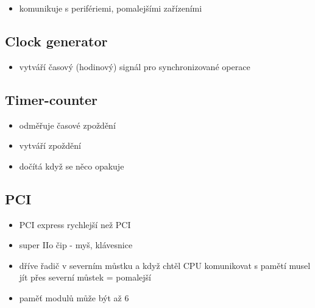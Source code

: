 \documentclass[a4paper,12pt]{article}
\begin{document}
\begin{itemize}
  \item komunikuje s perifériemi, pomalejšími zařízeními
\end{itemize}

\subsection{Clock generator}

\begin{itemize}
  \item vytváří časový (hodinový) signál pro synchronizované operace
\end{itemize}

\subsection{Timer-counter}

\begin{itemize}
  \item odměřuje časové zpoždění
  \item vytváří zpoždění
  \item dočítá když se něco opakuje
\end{itemize}
  
\subsection{PCI}
\begin{itemize}
  \item PCI express rychlejší než PCI
  \item super IIo čip - myš, klávesnice
\end{itemize}


\begin{itemize}
  \item dříve řadič v severním můstku a když chtěl CPU komunikovat s pamětí musel jít přes severní můstek = pomalejší
  \item paměť modulů může být až 6
\end{itemize}
\end{document}
